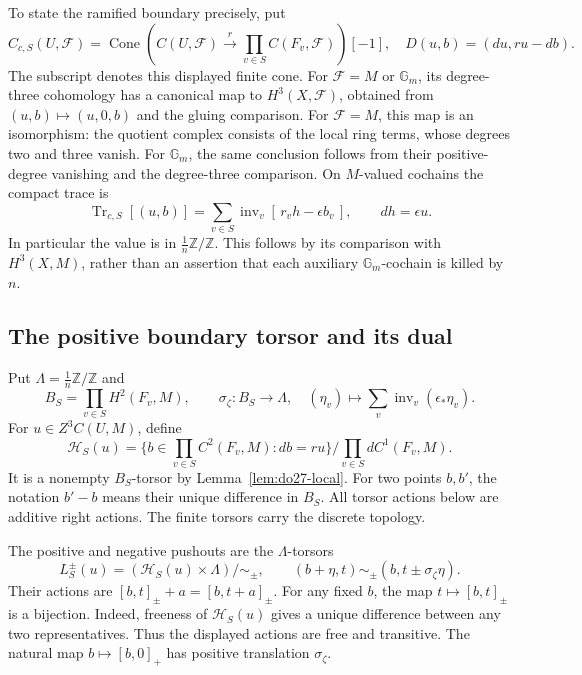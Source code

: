 To state the ramified boundary precisely, put
\[
 C_{c,S}(U,\mathcal F)=
 \operatorname{Cone}\left(C(U,\mathcal F)
         \xrightarrow r\prod_{v\in S}C(F_v,\mathcal F)\right)[-1],
 \quad D(u,b)=(du,ru-db).
\]
The subscript denotes this displayed finite cone. For \(\mathcal F=M\)
or \(\mathbb G_m\), its degree-three cohomology has a canonical
map to \(H^3(X,\mathcal F)\), obtained from
\((u,b)\mapsto(u,0,b)\) and the gluing comparison.
For \(\mathcal F=M\), this map is an isomorphism: the quotient
complex consists of the local ring terms, whose degrees two and
three vanish. For \(\mathbb G_m\), the same conclusion follows
from their positive-degree vanishing and the degree-three comparison.
On \(M\)-valued cochains the compact trace is
\begin{equation}
\label{eq:do27-compact-trace}
 \operatorname{Tr}_{c,S}[(u,b)]
  =\sum_{v\in S}\operatorname{inv}_v[\,r_vh-\epsilon b_v\,],
 \qquad dh=\epsilon u.
\end{equation}
In particular the value is in \(\tfrac1n\mathbb Z/\mathbb Z\).
This follows by its comparison with \(H^3(X,M)\), rather than an
assertion that each auxiliary \(\mathbb G_m\)-cochain is killed by \(n\).

\subsection{The positive boundary torsor and its dual}
\label{sec:do28-dual}

Put \(\Lambda=\tfrac1n\mathbb Z/\mathbb Z\) and
\[
 B_S=\prod_{v\in S}H^2(F_v,M),\qquad
 \sigma_\zeta:B_S\longrightarrow\Lambda,
 \quad(\eta_v)\longmapsto
       \sum_v\operatorname{inv}_v(\epsilon_*\eta_v).
\]
For \(u\in Z^3C(U,M)\), define
\[
 \mathcal H_S(u)=
 \{b\in\prod_{v\in S}C^2(F_v,M):db=ru\}/
                \prod_{v\in S}dC^1(F_v,M).
\]
It is a nonempty \(B_S\)-torsor by Lemma~\ref{lem:do27-local}.
For two points \(b,b'\), the notation \(b'-b\) means their unique
difference in \(B_S\). All torsor actions below are additive right
actions. The finite torsors carry the discrete topology.

The positive and negative pushouts are the \(\Lambda\)-torsors
\begin{equation}
\label{eq:do28-pushouts}
 L_S^\pm(u)=(\mathcal H_S(u)\times\Lambda)/\sim_\pm,
 \qquad (b+\eta,t)\sim_\pm(b,t\pm\sigma_\zeta\eta).
\end{equation}
Their actions are \([b,t]_\pm+a=[b,t+a]_\pm\).
For any fixed \(b\), the map \(t\mapsto[b,t]_\pm\) is a bijection.
Indeed, freeness of \(\mathcal H_S(u)\) gives a unique difference
between any two representatives. Thus the displayed actions are free
and transitive. The natural map \(b\mapsto[b,0]_+\) has positive
translation \(\sigma_\zeta\).

